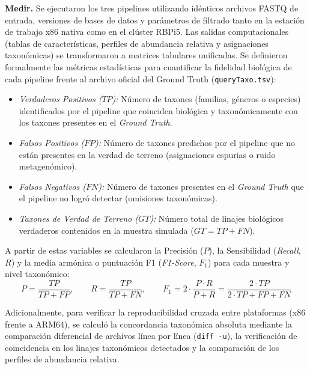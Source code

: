 \documentclass[12pt,oneside,spanish]{book}
\begin{document}
    \textbf{Medir.} Se ejecutaron los tres pipelines utilizando idénticos archivos FASTQ de entrada, versiones de bases de datos y parámetros de filtrado tanto en la estación de trabajo x86 nativa como en el clúster RBPi5. Las salidas computacionales (tablas de características, perfiles de abundancia relativa y asignaciones taxonómicas) se transformaron a matrices tabulares unificadas. Se definieron formalmente las métricas estadísticas para cuantificar la fidelidad biológica de cada pipeline frente al archivo oficial del Ground Truth (\texttt{queryTaxo.tsv}):
    
    \begin{itemize}
        \item \textit{Verdaderos Positivos ($TP$):} Número de taxones (familias, géneros o especies) identificados por el pipeline que coinciden biológica y taxonómicamente con los taxones presentes en el \textit{Ground Truth}.
        
        \item \textit{Falsos Positivos ($FP$):} Número de taxones predichos por el pipeline que no están presentes en la verdad de terreno (asignaciones espurias o ruido metagenómico).
        
        \item \textit{Falsos Negativos ($FN$):} Número de taxones presentes en el \textit{Ground Truth} que el pipeline no logró detectar (omisiones taxonómicas).
        
        \item \textit{Taxones de Verdad de Terreno ($GT$):} Número total de linajes biológicos verdaderos contenidos en la muestra simulada ($GT = TP + FN$).
    \end{itemize}
    
    A partir de estas variables se calcularon la Precisión ($P$), la Sensibilidad (\textit{Recall}, $R$) y la media armónica o puntuación F1 (\textit{F1-Score}, $F_1$) para cada muestra y nivel taxonómico:
    \begin{equation}
        P = \frac{TP}{TP + FP}, \qquad R = \frac{TP}{TP + FN}, \qquad F_1 = 2 \cdot \frac{P \cdot R}{P + R} = \frac{2 \cdot TP}{2 \cdot TP + FP + FN}
        \label{eq:metricas_biologicas}
    \end{equation}
    
    Adicionalmente, para verificar la reproducibilidad cruzada entre plataformas (x86 frente a ARM64), se calculó la concordancia taxonómica absoluta mediante la comparación diferencial de archivos línea por línea (\texttt{diff -u}), la verificación de coincidencia en los linajes taxonómicos detectados y la comparación de los perfiles de abundancia relativa.
    
\end{document}
